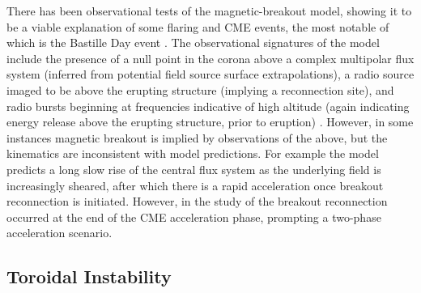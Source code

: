 There has been observational tests of the magnetic-breakout model, showing it to be a viable explanation of some flaring and CME events, the most notable of which is the Bastille Day event \citep{aulan2000}. The observational signatures of the model include the presence of a null point in the corona above a complex multipolar flux system (inferred from potential field source surface extrapolations), a radio source imaged to be above the erupting structure (implying a reconnection site), and radio bursts beginning at frequencies indicative of high altitude (again indicating energy release above the erupting structure, prior to eruption) \citep{mano2003}. However, in some instances magnetic breakout is implied by observations of the above, but the kinematics are inconsistent with model predictions. For example the model predicts a long slow rise of the central flux system as the underlying field is increasingly sheared, after which there is a rapid acceleration once breakout reconnection is initiated. However, in the study of \citet{bong2006} the breakout reconnection occurred at the end of the CME acceleration phase, prompting a two-phase acceleration scenario.


\subsection{Toroidal Instability}\label{sec:22}

